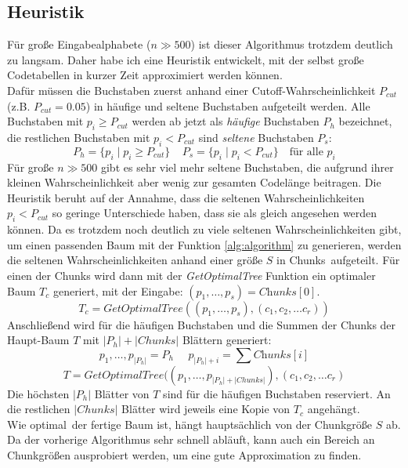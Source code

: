 \documentclass[a4paper,10pt,ngerman]{scrartcl}
\begin{document}
    \subsection{Heuristik}
    Für große Eingabealphabete ($n \gg 500$) ist dieser Algorithmus trotzdem deutlich zu langsam.
    Daher habe ich eine Heuristik entwickelt, mit der selbst große Codetabellen in kurzer Zeit approximiert werden können. \\
    Dafür müssen die Buchstaben zuerst anhand einer Cutoff-Wahrscheinlichkeit $P_{cut}$ (z.B. $P_{cut} = 0.05$) in häufige und seltene Buchstaben aufgeteilt werden.
    Alle Buchstaben mit $p_i \ge P_{cut}$ werden ab jetzt als \textit{häufige} Buchstaben $P_h$ bezeichnet, die restlichen Buchstaben mit $p_i < P_{cut}$ sind \textit{seltene} Buchstaben $P_s$:
    \[P_{h} = \{p_i \mid p_i \ge P_{cut}\}~~~~~P_s = \{p_i \mid p_i < P_{cut}\} \text{~~~für alle $p_i$}\]
    Für große $n \gg 500$ gibt es sehr viel mehr seltene Buchstaben, die aufgrund ihrer kleinen Wahrscheinlichkeit aber wenig zur gesamten Codelänge beitragen.
    Die Heuristik beruht auf der Annahme, dass die seltenen Wahrscheinlichkeiten $p_i < P_{cut}$ so geringe Unterschiede haben, dass sie als gleich angesehen werden können.
    Da es trotzdem noch deutlich zu viele seltenen Wahrscheinlichkeiten gibt, um einen passenden Baum mit der Funktion \ref{alg:algorithm} zu generieren, werden die seltenen Wahrscheinlichkeiten anhand einer größe $S$ in \glqq Chunks\grqq~aufgeteilt.
    Für einen der Chunks wird dann mit der \textit{GetOptimalTree} Funktion ein optimaler Baum $T_c$ generiert, mit der Eingabe: $(p_1, \dots, p_s) = \textit{Chunks}[0]$.
    \[T_c = \textit{GetOptimalTree}((p_1, \dots, p_s), (c_1, c_2, \dots c_r))\]
    Anschließend wird für die häufigen Buchstaben und die Summen der Chunks der Haupt-Baum $T$ mit $|P_h| + |Chunks|$ Blättern generiert:
    \[p_1, \dots, p_{|P_h|} = P_h~~~~~~p_{|P_h| + i} = \sum \textit{Chunks}[i]\]
    \[T = \textit{GetOptimalTree}((p_1, \dots, p_{|P_h| + |Chunks|}), (c_1, c_2, \dots c_r)\]
    Die höchsten $|P_h|$ Blätter von $T$ sind für die häufigen Buchstaben \glqq reserviert\grqq.
    An die restlichen $|Chunks|$ Blätter wird jeweils eine Kopie von $T_c$ angehängt. \\
    Wie \glqq optimal\grqq~der fertige Baum ist, hängt hauptsächlich von der Chunkgröße $S$ ab.
    Da der vorherige Algorithmus sehr schnell abläuft, kann auch ein Bereich an Chunkgrößen ausprobiert werden, um eine gute Approximation zu finden.
\end{document}
